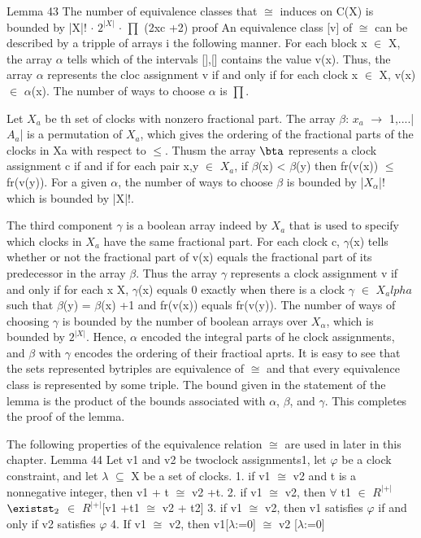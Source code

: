 Lemma 43
The number of equivalence classes that $\cong$ induces on C(X) is bounded by
|X|! $\cdot$ $2^{|X|}$ $\cdot$ $\prod$ (2xc +2)
proof
An equivalence class [v] of $\cong$ can be described by a tripple	 of arrays i the following manner. For each block x $\in$ X, the array $\alpha$ tells which of the intervals {[],[]}
contains the value v(x). Thus, the array $\alpha$ represents the cloc assignment v if and only if for each clock x $\in$ X, v(x)$\in$ $\alpha$(x). The number of ways to choose $\alpha$ is $\prod$. \\ 
\newline


Let $X_a$ be th set of clocks with nonzero fractional part. The array $\beta$: $x_a$ $\rightarrow$ {1,....|$A_a$|} is a permutation of $X_a$, which gives the ordering of the fractional parts of the clocks in Xa with respect to $\leq$. Thusm the array $\bta$ represents a clock assignment c if and if for each pair x,y $\in$ $X_a$, if $\beta$(x) < $\beta$(y) then fr(v(x)) $\leq$ fr(v(y)). For a given $\alpha$, the number of ways to choose $\beta$ is bounded by |$X_\alpha$|!  which is bounded by |X|!. \\
\newline

The third component  $\gamma$ is a boolean array indeed by $X_a$ that is used to specify which clocks in $X_a$ have the same fractional part. For each clock c, $\gamma$(x) tells whether or not the fractional part of v(x) equals  the fractional part of its predecessor in the array $\beta$. Thus the array $\gamma$ represents a clock assignment v if and only if for each x \n X, $\gamma$(x) equals 0 exactly when there is a clock $\gamma$ $\in$ $X_alpha$ such that $\beta$(y) = $\beta$(x) +1 and fr(v(x)) equals fr(v(y)). The number of ways of choosing $\gamma$ is bounded by the number of boolean arrays over $X_\alpha$, which is bounded by $2^{|X|}$.
Hence, $\alpha$ encoded the integral parts of he clock assignments, and $\beta$ with $\gamma$ encodes the ordering of their fractioal aprts. It is easy to see that the sets represented bytriples are equivalence of $\cong$ and that every equivalence class is represented by some triple. The bound given in the statement of the lemma is the product of the bounds associated with $\alpha$, $\beta$, and $\gamma$. This completes the proof of the lemma. \\
\newline


The following properties of the equivalence relation $\cong$ are used in later  in this chapter.
Lemma 44
Let v1 and v2 be twoclock assignments1, let $\varphi$ be a clock constraint, and let $\lambda$ $\subseteq$ X be a set of clocks.
1. if v1 $\cong$ v2 and t is a nonnegative integer, then v1 + t $\cong$ v2 +t.
2. if v1 $\cong$ v2, then $\forall$ t1 $\in$ $R^{|+|}$ $\existst_2$ $\in$ $R^{|+|}$[v1 +t1 $\cong$ v2 + t2]
3. if v1 $\cong$ v2, then v1 satisfies $\varphi$ if and only if v2 satisfies $\varphi$
4. If v1 $\cong$ v2, then v1[$\lambda$:=0] $\cong$ v2 [$\lambda$:=0]
\\
\newline

